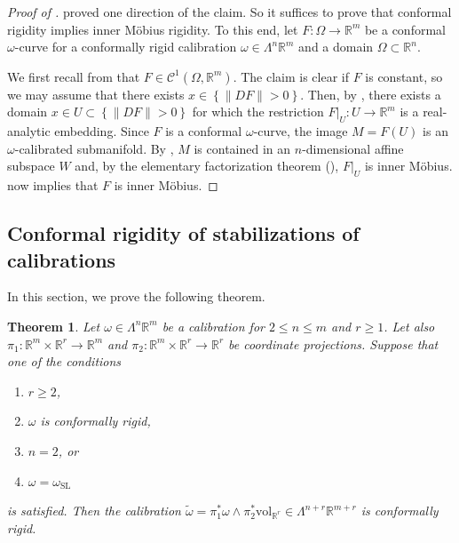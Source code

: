 \documentclass[a4paper,leqno,11pt]{amsart}
\numberwithin{equation}{section}
\newtheorem{theorem}{Theorem}[section]
\theoremstyle{remark}
\theoremstyle{remark}
\newcommand{\R}{\mathbb{R}}
\newcommand{\vol}{\mathrm{vol}}
\newcommand{\SL}{\mathrm{SL}}
\begin{document}
\begin{proof}[Proof of ]
 proved one direction of the claim. So it suffices to prove that conformal rigidity implies inner Möbius rigidity. To this end, let $F \colon \Omega \rightarrow \mathbb{R}^m$ be a conformal $\omega$-curve for a conformally rigid calibration $\omega \in \Lambda^n \R^m$ and a domain $\Omega \subset \R^n$.

We first recall from  that $F \in \mathcal{C}^{1}( \Omega, \mathbb{R}^m )$. The claim is clear if $F$ is constant, so we may assume that there exists $x \in \left\{ \|DF\| > 0 \right\}$. Then, by , there exists a domain $x \in U \subset \left\{ \|DF\| > 0 \right\}$ for which the restriction $F|_{ U } \colon U \to \R^m$ is a real-analytic embedding. Since $F$ is a conformal $\omega$-curve, the image $M = F( U )$ is an $\omega$-calibrated submanifold. By , $M$ is contained in an $n$-dimensional affine subspace $W$ and, by the elementary factorization theorem (), $F|_{U}$ is inner M\"obius.  now implies that $F$ is inner Möbius.
\end{proof}







\subsection{Conformal rigidity of stabilizations of calibrations}
\label{sec:products}


In this section, we prove the following theorem.

\begin{theorem}
\label{thm:product}
Let $\omega \in \Lambda^n\R^m$ be a calibration for $2\le n \le m$ and $r\ge 1$. Let also $\pi_1 \colon \R^m \times \R^r \to \R^m$ and $\pi_2 \colon \R^m \times \R^r \to \R^r$ be coordinate projections. Suppose that one of the conditions 
\begin{enumerate}
\item $r \ge 2$,
\item $\omega$ is conformally rigid,
\item $n=2$, or 
\item $\omega = \omega_\SL$
\end{enumerate}
is satisfied. Then the calibration $\widetilde \omega = \pi_1^*\omega\wedge \pi_2^*\vol_{\R^r} \in \Lambda^{n+r}\R^{m+r}$ is conformally rigid.
\end{theorem}
\end{document}
